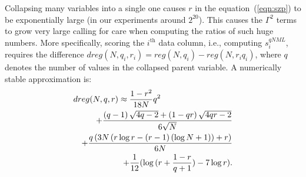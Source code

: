 Collapsing many variables into a single one causes $r$ in the
equation~(\ref{eqn:szp}) to be exponentially large (in our experiments
around $2^{20}$).  This causes the $\Gamma^2$ terms to grow very large
calling for care when computing the ratios of such huge numbers. More
specifically, scoring the $i^\text{th}$ data column, i.e., computing
$s^{qNML}_i$, requires the difference $dreg(N,q_i,r_i)=reg(N,q_i) -
reg(N,r_i q_i)$, where $q$ denotes the number of values in the
collapsed parent variable.  A numerically stable approximation is:
\begin{eqnarray}
\lefteqn{dreg(N,q,r)\approx\frac{1-r^2}{18 N} q^{2}} \\
&&+ \frac{\left(q - 1\right) \sqrt{4 q - 2} + \left(1 - q r\right) \sqrt{4 q r - 2}}{6 \sqrt{N}} \nonumber\\
&&+\frac{q\left(3 N \left(r \log{r}  - \left(r - 1\right) \left(\log{N} + 1\right)\right) + r\right)}{6 N} \nonumber\\
&&+ \frac{1}{12}(\log{(r+\frac{1-r}{q+1})}- 7\log{r}).\nonumber
\end{eqnarray}
